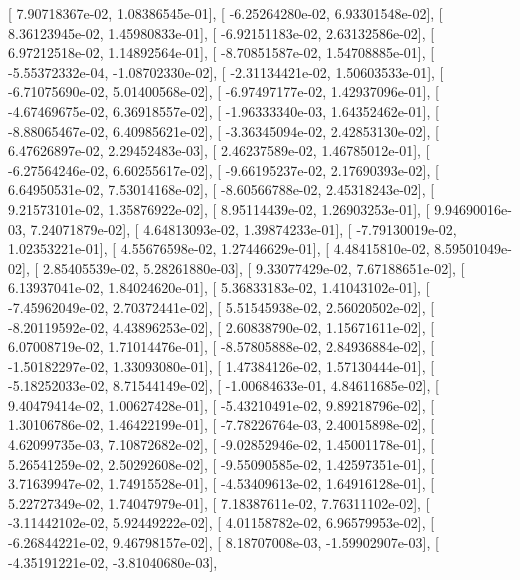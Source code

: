 \documentclass{article}
\begin{document}
       [  7.90718367e-02,   1.08386545e-01],
       [ -6.25264280e-02,   6.93301548e-02],
       [  8.36123945e-02,   1.45980833e-01],
       [ -6.92151183e-02,   2.63132586e-02],
       [  6.97212518e-02,   1.14892564e-01],
       [ -8.70851587e-02,   1.54708885e-01],
       [ -5.55372332e-04,  -1.08702330e-02],
       [ -2.31134421e-02,   1.50603533e-01],
       [ -6.71075690e-02,   5.01400568e-02],
       [ -6.97497177e-02,   1.42937096e-01],
       [ -4.67469675e-02,   6.36918557e-02],
       [ -1.96333340e-03,   1.64352462e-01],
       [ -8.88065467e-02,   6.40985621e-02],
       [ -3.36345094e-02,   2.42853130e-02],
       [  6.47626897e-02,   2.29452483e-03],
       [  2.46237589e-02,   1.46785012e-01],
       [ -6.27564246e-02,   6.60255617e-02],
       [ -9.66195237e-02,   2.17690393e-02],
       [  6.64950531e-02,   7.53014168e-02],
       [ -8.60566788e-02,   2.45318243e-02],
       [  9.21573101e-02,   1.35876922e-02],
       [  8.95114439e-02,   1.26903253e-01],
       [  9.94690016e-03,   7.24071879e-02],
       [  4.64813093e-02,   1.39874233e-01],
       [ -7.79130019e-02,   1.02353221e-01],
       [  4.55676598e-02,   1.27446629e-01],
       [  4.48415810e-02,   8.59501049e-02],
       [  2.85405539e-02,   5.28261880e-03],
       [  9.33077429e-02,   7.67188651e-02],
       [  6.13937041e-02,   1.84024620e-01],
       [  5.36833183e-02,   1.41043102e-01],
       [ -7.45962049e-02,   2.70372441e-02],
       [  5.51545938e-02,   2.56020502e-02],
       [ -8.20119592e-02,   4.43896253e-02],
       [  2.60838790e-02,   1.15671611e-02],
       [  6.07008719e-02,   1.71014476e-01],
       [ -8.57805888e-02,   2.84936884e-02],
       [ -1.50182297e-02,   1.33093080e-01],
       [  1.47384126e-02,   1.57130444e-01],
       [ -5.18252033e-02,   8.71544149e-02],
       [ -1.00684633e-01,   4.84611685e-02],
       [  9.40479414e-02,   1.00627428e-01],
       [ -5.43210491e-02,   9.89218796e-02],
       [  1.30106786e-02,   1.46422199e-01],
       [ -7.78226764e-03,   2.40015898e-02],
       [  4.62099735e-03,   7.10872682e-02],
       [ -9.02852946e-02,   1.45001178e-01],
       [  5.26541259e-02,   2.50292608e-02],
       [ -9.55090585e-02,   1.42597351e-01],
       [  3.71639947e-02,   1.74915528e-01],
       [ -4.53409613e-02,   1.64916128e-01],
       [  5.22727349e-02,   1.74047979e-01],
       [  7.18387611e-02,   7.76311102e-02],
       [ -3.11442102e-02,   5.92449222e-02],
       [  4.01158782e-02,   6.96579953e-02],
       [ -6.26844221e-02,   9.46798157e-02],
       [  8.18707008e-03,  -1.59902907e-03],
       [ -4.35191221e-02,  -3.81040680e-03],
\end{document}
